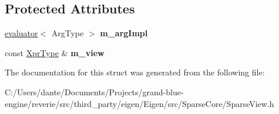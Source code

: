 \subsection*{Protected Attributes}
\begin{DoxyCompactItemize}
\item 
\mbox{\label{struct_eigen_1_1internal_1_1unary__evaluator_3_01_sparse_view_3_01_arg_type_01_4_00_01_iterator_based_01_4_a5c7ae23697fe4b54d819b5bf3c09541a}} 
\mbox{\hyperlink{struct_eigen_1_1internal_1_1evaluator}{evaluator}}$<$ Arg\+Type $>$ {\bfseries m\+\_\+arg\+Impl}
\item 
\mbox{\label{struct_eigen_1_1internal_1_1unary__evaluator_3_01_sparse_view_3_01_arg_type_01_4_00_01_iterator_based_01_4_a1d009c830dfa9b8bff40e5ab0a6361f4}} 
const \mbox{\hyperlink{class_eigen_1_1_sparse_view}{Xpr\+Type}} \& {\bfseries m\+\_\+view}
\end{DoxyCompactItemize}


The documentation for this struct was generated from the following file\+:\begin{DoxyCompactItemize}
\item 
C\+:/\+Users/dante/\+Documents/\+Projects/grand-\/blue-\/engine/reverie/src/third\+\_\+party/eigen/\+Eigen/src/\+Sparse\+Core/Sparse\+View.\+h\end{DoxyCompactItemize}

